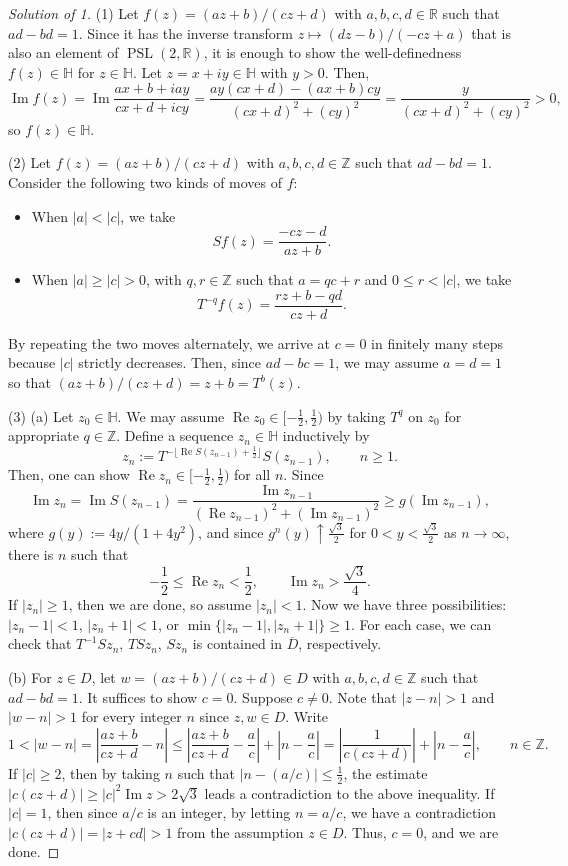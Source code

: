 \documentclass[a4paper]{article}
\theoremstyle{definition}
\renewcommand{\Re}{\operatorname{Re}}
\renewcommand{\Im}{\operatorname{Im}}
\renewcommand{\H}{\mathbb{H}}
\newcommand{\R}{\mathbb{R}}
\newcommand{\Z}{\mathbb{Z}}
\newcommand{\PSL}{\operatorname{PSL}}
\renewcommand{\bar}{\overline}
\begin{document}
\begin{proof}[Solution of 1]
(1)
Let $f(z)=(az+b)/(cz+d)$ with $a,b,c,d\in\R$ such that $ad-bd=1$.
Since it has the inverse transform $z\mapsto(dz-b)/(-cz+a)$ that is also an element of $\PSL(2,\R)$, it is enough to show the well-definedness $f(z)\in\H$ for $z\in\H$.
Let $z=x+iy\in\H$ with $y>0$.
Then,
\[\Im f(z)=\Im\frac{ax+b+iay}{cx+d+icy}=\frac{ay(cx+d)-(ax+b)cy}{(cx+d)^2+(cy)^2}=\frac y{(cx+d)^2+(cy)^2}>0,\]
so $f(z)\in\H$.

(2)
Let $f(z)=(az+b)/(cz+d)$ with $a,b,c,d\in\Z$ such that $ad-bd=1$.
Consider the following two kinds of moves of $f$:
\begin{itemize}
\item When $|a|<|c|$, we take
\[Sf(z)=\frac{-cz-d}{az+b}.\]
\item When $|a|\ge|c|>0$, with $q,r\in\Z$ such that $a=qc+r$ and $0\le r<|c|$, we take
\[T^{-q}f(z)=\frac{rz+b-qd}{cz+d}.\]
\end{itemize}
By repeating the two moves alternately, we arrive at $c=0$ in finitely many steps because $|c|$ strictly decreases.
Then, since $ad-bc=1$, we may assume $a=d=1$ so that $(az+b)/(cz+d)=z+b=T^b(z)$.


(3)
(a)
Let $z_0\in\H$.
We may assume $\Re z_0\in[-\frac12,\frac12)$ by taking $T^q$ on $z_0$ for appropriate $q\in\Z$.
Define a sequence $z_n\in\H$ inductively by
\[z_n:=T^{-\lfloor\Re S(z_{n-1})+\frac12\rfloor}S(z_{n-1}),\qquad n\ge1.\]
Then, one can show $\Re z_n\in[-\frac12,\frac12)$ for all $n$.
Since
\[\Im z_n=\Im S(z_{n-1})=\frac{\Im z_{n-1}}{(\Re z_{n-1})^2+(\Im z_{n-1})^2}\ge g(\Im z_{n-1}),\]
where $g(y):=4y/(1+4y^2)$, and since $g^n(y)\uparrow\frac{\sqrt3}2$ for $0<y<\frac{\sqrt3}2$ as $n\to\infty$, there is $n$ such that
\[-\frac12\le\Re z_n<\frac12,\qquad\Im z_n>\frac{\sqrt3}4.\]
If $|z_n|\ge1$, then we are done, so assume $|z_n|<1$.
Now we have three possibilities: $|z_n-1|<1$, $|z_n+1|<1$, or $\min\{|z_n-1|,|z_n+1|\}\ge1$.
For each case, we can check that $T^{-1}Sz_n$, $TSz_n$, $Sz_n$ is contained in $\bar D$, respectively.

(b)
For $z\in D$, let $w=(az+b)/(cz+d)\in D$ with $a,b,c,d\in\Z$ such that $ad-bd=1$.
It suffices to show $c=0$.
Suppose $c\ne0$.
Note that $|z-n|>1$ and $|w-n|>1$ for every integer $n$ since $z,w\in D$.
Write
\[1<|w-n|=\left|\frac{az+b}{cz+d}-n\right|\le\left|\frac{az+b}{cz+d}-\frac ac\right|+\left|n-\frac ac\right|=\left|\frac1{c(cz+d)}\right|+\left|n-\frac ac\right|,\qquad n\in\Z.\]
If $|c|\ge2$, then by taking $n$ such that $|n-(a/c)|\le\frac12$, the estimate $|c(cz+d)|\ge|c|^2\Im z>2\sqrt3$ leads a contradiction to the above inequality.
If $|c|=1$, then since $a/c$ is an integer, by letting $n=a/c$, we have a contradiction $|c(cz+d)|=|z+cd|>1$ from the assumption $z\in D$.
Thus, $c=0$, and we are done.


\end{proof}
\end{document}
